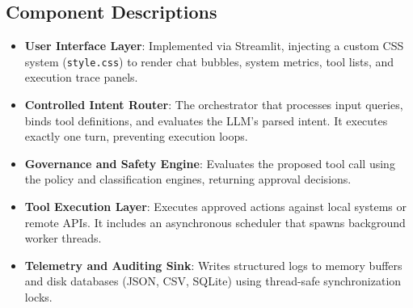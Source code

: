 \documentclass{article}
\begin{document}
\subsection{Component Descriptions}
\begin{itemize}
    \item \textbf{User Interface Layer}: Implemented via Streamlit, injecting a custom CSS system (\texttt{style.css}) to render chat bubbles, system metrics, tool lists, and execution trace panels.
    \item \textbf{Controlled Intent Router}: The orchestrator that processes input queries, binds tool definitions, and evaluates the LLM's parsed intent. It executes exactly one turn, preventing execution loops.
    \item \textbf{Governance and Safety Engine}: Evaluates the proposed tool call using the policy and classification engines, returning approval decisions.
    \item \textbf{Tool Execution Layer}: Executes approved actions against local systems or remote APIs. It includes an asynchronous scheduler that spawns background worker threads.
    \item \textbf{Telemetry and Auditing Sink}: Writes structured logs to memory buffers and disk databases (JSON, CSV, SQLite) using thread-safe synchronization locks.
\end{itemize}
\end{document}
